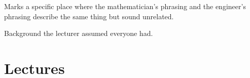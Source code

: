 \documentclass[11pt]{report}
\begin{document}
\begin{pitfall}
Marks a specific place where the mathematician's phrasing and the engineer's
phrasing describe the same thing but sound unrelated.
\end{pitfall}

\begin{recall}
Background the lecturer assumed everyone had.
\end{recall}

\noindent
{}

\tableofcontents

\cleardoublepage
{}

\chapter{Lectures}













\end{document}
